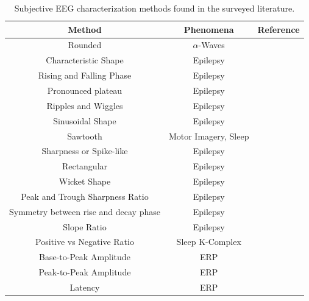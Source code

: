 \documentclass[brainsci,article,submit,moreauthors,pdftex,10pt,a4paper]{mdpi}
\begin{document}


\begin{table}[H]
\caption{Subjective EEG characterization methods found in the surveyed literature.}
\centering
\begin{tabular}{ccc}
\toprule
\textbf{Method}	& \textbf{Phenomena} & \textbf{Reference}	\\
\midrule
Rounded                                & $\alpha$-Waves & \citep{Schomer2010} \\
Characteristic Shape           & Epilepsy &  \citep{Cacioppo2007, Mak2010} \\
Rising and Falling Phase      & Epilepsy &  \citep{Cacioppo2007, Mak2010} \\
Pronounced plateau      & Epilepsy &  \citep{Cacioppo2007, Mak2010} \\
Ripples and Wiggles     & Epilepsy &  \citep{Cacioppo2007, Mak2010} \\
Sinusoidal Shape        & Epilepsy &  \citep{Cacioppo2007, Mak2010} \\
Sawtooth                     & Motor Imagery, Sleep &  \citep{Cacioppo2007, Mak2010} \\
Sharpness or Spike-like     & Epilepsy &  \citep{Cacioppo2007, Mak2010} \\
Rectangular     & Epilepsy &  \citep{Cacioppo2007, Mak2010} \\
Wicket Shape     & Epilepsy &  \citep{Cacioppo2007, Mak2010} \\
Peak and Trough Sharpness Ratio     & Epilepsy &  \citep{Cacioppo2007, Mak2010} \\
Symmetry between rise and decay phase     & Epilepsy &  \citep{Cacioppo2007, Mak2010} \\
Slope Ratio    & Epilepsy &  \citep{Cacioppo2007, Mak2010} \\
Positive vs Negative Ratio    & Sleep K-Complex &  \citep{Cacioppo2007, Mak2010} \\
Base-to-Peak Amplitude     & ERP  &  \citep{Cacioppo2007, Mak2010} \\
Peak-to-Peak Amplitude     & ERP  &  \citep{Cacioppo2007, Mak2010} \\
Latency                                 & ERP  & \citep{Cacioppo2007, Mak2010}  \\

\end{tabular}
\end{table}
\end{document}

